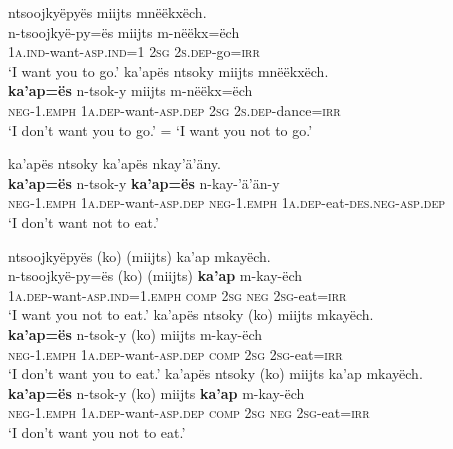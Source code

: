 \documentclass[output=paper,colorlinks,citecolor=brown,draft]{langscibook}
\begin{document}
\ea\label{ex:mix:95}
    \ea\label{ex:mix:95a}
        \glll ntsoojkyëpyës miijts mnëëkxëch.\\
             n-tsoojkyë-py=ës miijts m-nëëkx=ëch\\
             \textsc{1a.ind-}want\textsc{-asp.ind=1} \textsc{2sg} \textsc{2s.dep-}go=\textsc{irr} \\
        \glt ‘I want you to go.’
    \ex\label{ex:mix:95b}
        \glll ka’apës ntsoky miijts mnëëkxëch.\\ 
              \textbf{ka’ap=ës} n-tsok-y miijts m-nëëkx=ëch\\
              \textsc{neg-1.emph} \textsc{1a.dep-}want\textsc{-asp.dep} \textsc{2sg} \textsc{2s.dep-}dance=\textsc{irr}\\
        \glt ‘I don’t want you to go.’ = ‘I want you not to go.’ 
    \z
\z 

\ea\label{ex:mix:96}
    \glll ka’apës ntsoky ka’apës nkay’ä’äny. \\
         \textbf{ka’ap=ës} n-tsok-y \textbf{ka’ap=ës} n-kay-’ä’än-y\\
         \textsc{neg-1.emph} \textsc{1a.dep-}want\textsc{-asp.dep} \textsc{neg-1.emph} \textsc{1a.dep-}eat\textsc{-des.neg-asp.dep} \\
    \glt ‘I don’t want not to eat.’
\z
 
\ea\label{ex:mix:97}
    \ea\label{ex:mix:97a}
        \glll ntsoojkyëpyës (ko) (miijts) ka’ap mkayëch.\\ 
              n-tsoojkyë-py=ës (ko) (miijts) \textbf{ka’ap} m-kay-ëch\\
              \textsc{1a.dep-}want\textsc{-asp.ind=1.emph} \textsc{comp} \textsc{2sg} \textsc{neg} \textsc{2sg-}eat=\textsc{irr}\\
        \glt ‘I want you not to eat.’
    \ex\label{ex:mix:97b}
        \glll ka’apës ntsoky (ko) miijts mkayëch.\\
             \textbf{ka’ap=ës} n-tsok-y (ko) miijts m-kay-ëch \\
             \textsc{neg-1.emph} \textsc{1a.dep-}want\textsc{-asp.dep} \textsc{comp} \textsc{2sg} \textsc{2sg-}eat=\textsc{irr}\\
        \glt ‘I don’t want you to eat.’
    \ex\label{ex:mix:97c}
        \glll ka’apës ntsoky (ko) miijts ka’ap mkayëch.\\
             \textbf{ka’ap=ës} n-tsok-y (ko) miijts \textbf{ka’ap} m-kay-ëch\\
             \textsc{neg-1.emph} \textsc{1a.dep-}want\textsc{-asp.dep} \textsc{comp} \textsc{2sg} \textsc{neg} \textsc{2sg-}eat=\textsc{irr} \\
        \glt ‘I don’t want you not to eat.’
    \z
\z 
\end{document}
